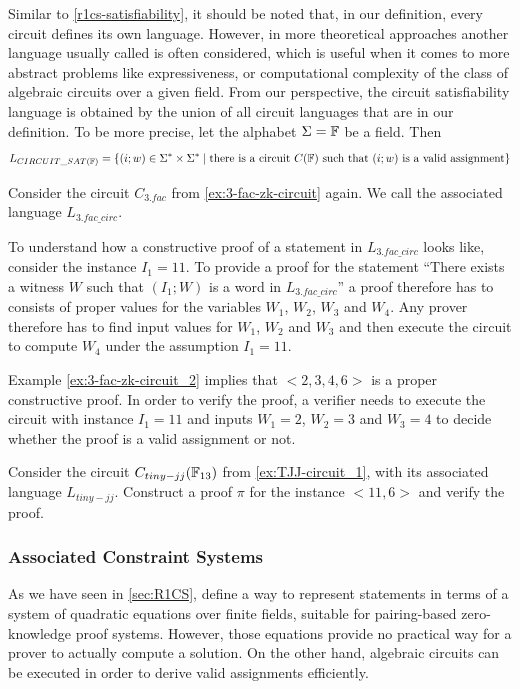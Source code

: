 \begin{remark} Similar to \ref{r1cs-satisfiability}, it should be noted that, in our definition, every circuit defines its own language. However, in more theoretical approaches another language usually called  is often considered, which is useful when it comes to more abstract problems like expressiveness, or computational complexity of the class of  algebraic circuits over a given field. From our perspective, the circuit satisfiability language is obtained by the union of all circuit languages that are in our definition. To be more precise, let the alphabet $\Sigma=\mathbb{F}$ be a field. Then 
$$
L_{CIRCUIT\_SAT(\mathbb{F})} = \{(i;w)\in \Sigma^*\times \Sigma^*\;|\; \text{there is a circuit } C(\mathbb{F}) \text{ such that } (i;w) \text{ is a valid assignment}\}
$$
\end{remark}
\begin{example}[3-Factorization]Consider the circuit $C_{3.fac}$ from \examplename{} \ref{ex:3-fac-zk-circuit} again. We call the associated language $L_{3.fac\_circ}$.

To understand how a constructive proof of a statement in $L_{3.fac\_circ}$ looks like, consider the instance $I_1= 11$. To provide a proof for the statement ``There exists a witness $W$ such that $(I_1;W)$ is a word in $L_{3.fac\_circ}$'' a proof therefore has to consists of proper values for the variables $W_1$, $W_2$, $W_3$ and $W_4$. Any prover therefore has to find input values for $W_1$, $W_2$ and $W_3$ and then execute the circuit to compute $W_4$ under the assumption $I_1=11$. 

Example \ref{ex:3-fac-zk-circuit_2} implies that $<2,3,4,6>$ is a proper constructive proof. In order to verify the proof, a verifier needs to execute the circuit with instance $I_1=11$ and inputs $W_1=2$, $W_2=3$ and $W_3=4$ to decide whether the proof is a valid assignment or not. 
\end{example}
\begin{exercise}
Consider the circuit $C_{tiny-jj}(\mathbb{F}_{13})$ from \examplename{} \ref{ex:TJJ-circuit_1}, with its associated language $L_{tiny-jj}$. Construct a proof $\pi$ for the instance $<11,6>$ and verify the proof.
\end{exercise}

\subsubsection{Associated Constraint Systems}
\label{sec:circuits_associated_R1CS} As we have seen in \ref{sec:R1CS},  define a way to represent statements in terms of a system of quadratic equations over finite fields, suitable for pairing-based zero-knowledge proof systems. However,  those equations provide no practical way for a prover to actually compute a solution. On the other hand, algebraic circuits can be executed in order to derive valid assignments efficiently. 

